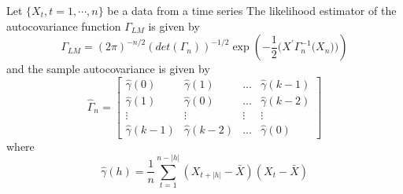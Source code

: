 \documentclass[11pt, oneside]{article}   	%
\begin{document}
Let $\{ X_{t}, t = 1, \cdots, n \}$ be a data from a time series
The likelihood estimator of the autocovariance function $\Gamma_{LM}$ is given by \cite{petter}
\begin{equation}
\Gamma_{LM} = (2\pi)^{-n/2}(det(\Gamma_{n}))^{-1/2}\exp\left(  -\frac{1}{2}\mathbb(X^{\prime}\Gamma_{n}^{-1}\mathbb(X_{n})) \right)
\end{equation}
and the sample autocovariance is given by
\begin{equation}
\hat{\Gamma}_{n} = 
\begin{bmatrix}
    \hat{\gamma}(0) & \hat{\gamma}(1)  & \dots  & \hat{\gamma}(k-1) \\
        \hat{\gamma}(1) & \hat{\gamma}(0) & \dots  & \hat{\gamma}(k-2) \\
    \vdots & \vdots & \vdots & \vdots \\
        \hat{\gamma}(k-1) & \hat{\gamma}(k-2)  & \dots  & \hat{\gamma}(0)
\end{bmatrix}
\end{equation}
where 
\begin{equation}
\hat{\gamma}(h) = \frac{1}{n}\sum_{t=1}^{n-|h|}(X_{t+|h|}-\bar{X})(X_{t}-\bar{X})
\end{equation}
\end{document}
